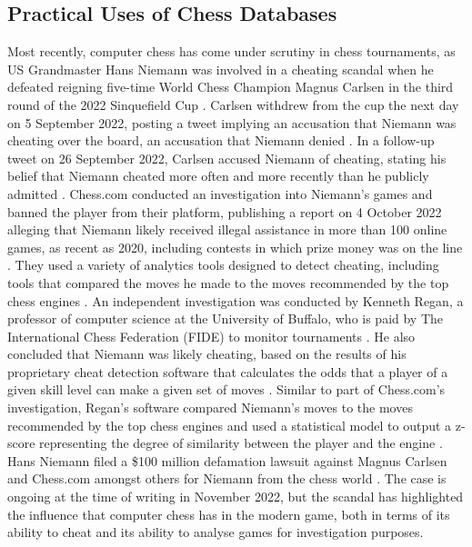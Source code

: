 \documentclass[%
 superscriptaddress,
showpacs,preprintnumbers,
 amsmath,
 amssymb,
 aps,
 pra,
showkeys,
onecolumn,
notitlepage,
11pt,
tightenlines      %
]{revtex4-1}
\begin{document}
\subsection{Practical Uses of Chess Databases}
Most recently, computer chess has come under scrutiny in chess tournaments, as US Grandmaster Hans Niemann was involved in a cheating scandal when he defeated reigning five-time World Chess Champion Magnus Carlsen in the third round of the 2022 Sinquefield Cup \cite{niemannDefeatsCarlsen}. Carlsen withdrew from the cup the next day on 5 September 2022, posting a tweet implying an accusation that Niemann was cheating over the board, an accusation that Niemann denied \cite{niemannCheatingAllegations}. In a follow-up tweet on 26 September 2022, Carlsen accused Niemann of cheating, stating his belief that Niemann cheated more often and more recently than he publicly admitted \cite{niemannCheatingAllegations2}. Chess.com conducted an investigation into Niemann's games and banned the player from their platform, publishing a report on 4 October 2022 alleging that Niemann likely received illegal assistance in more than 100 online games, as recent as 2020, including contests in which prize money was on the line \cite{niemannCheatingChessComReport}. They used a variety of analytics tools designed to detect cheating, including tools that compared the moves he made to the moves recommended by the top chess engines \cite{niemannCheatingChessComReport}. An independent investigation was conducted by Kenneth Regan, a professor of computer science at the University of Buffalo, who is paid by The International Chess Federation (FIDE) to monitor tournaments \cite{niemannCheatingReganReport}. He also concluded that Niemann was likely cheating, based on the results of his proprietary cheat detection software that calculates the odds that a player of a given skill level can make a given set of moves \cite{niemannCheatingReganReport}. Similar to part of Chess.com's investigation, Regan's software compared Niemann's moves to the moves recommended by the top chess engines and used a statistical model to output a z-score representing the degree of similarity between the player and the engine \cite{niemannCheatingReganReport}. Hans Niemann filed a \$100 million defamation lawsuit against Magnus Carlsen and Chess.com amongst others for  Niemann from the chess world \cite{niemannCheatingDefamationLawsuit}. The case is ongoing at the time of writing in November 2022, but the scandal has highlighted the influence that computer chess has in the modern game, both in terms of its ability to cheat and its ability to analyse games for investigation purposes.
\end{document}
